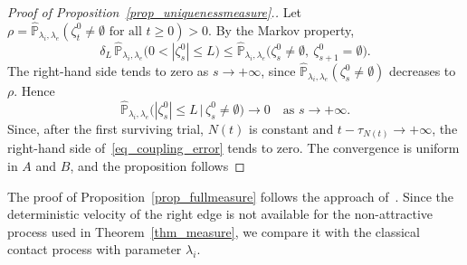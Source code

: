 \documentclass[11pt,a4paper]{article}
\theoremstyle{plain}
\theoremstyle{definition}
\theoremstyle{remark}
\numberwithin{equation}{section}
\begin{document}
\begin{proof}[{Proof of Proposition~\ref{prop_uniquenessmeasure}.}]
	Let $\rho=\widehat{\mathbb{P}}_{\lambda_i,\lambda_e}(\zeta_t^0\neq\emptyset\text{ for all }t\geq0)>0$. By the Markov property,
	\[
	\delta_L\,
	\widehat{\mathbb{P}}_{\lambda_i,\lambda_e}
	\big(0<|\zeta_s^0|\leq L\big)
	\leq
	\widehat{\mathbb{P}}_{\lambda_i,\lambda_e}
	\big(\zeta_s^0\neq\emptyset,\ \zeta_{s+1}^0=\emptyset\big).
	\]
	The right-hand side tends to zero as $s\to+\infty$, since $\widehat{\mathbb{P}}_{\lambda_i,\lambda_e}(\zeta_s^0\neq\emptyset)$ decreases to $\rho$. Hence
	\[
	\widehat{\mathbb{P}}_{\lambda_i,\lambda_e}
	\big(|\zeta_s^0|\leq L\,\big|\,\zeta_s^0\neq\emptyset\big)
	\longrightarrow0
	\quad\text{as }s\to+\infty.
	\]
	Since, after the first surviving trial, $N(t)$ is constant and $t-\tau_{N(t)}\to+\infty$, the right-hand side of~\eqref{eq_coupling_error} tends to zero. The convergence is uniform in $A$ and $B$, and the proposition follows
	\end{proof}
	
	The proof of Proposition~\ref{prop_fullmeasure} follows the approach of~\cite{ASS90}. Since the deterministic velocity of the right edge is not available for the non-attractive process used in Theorem~\ref{thm_measure}, we compare it with the classical contact process with parameter $\lambda_i$.
	
\end{document}
